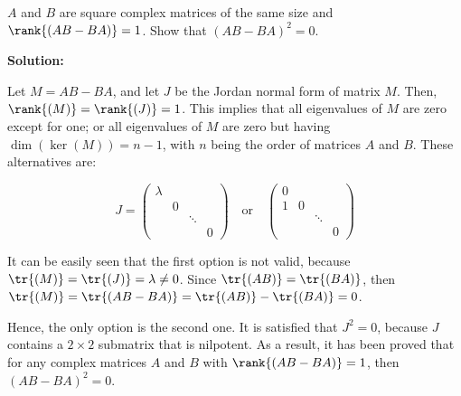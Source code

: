 \documentclass[../../main.tex]{subfiles}
\begin{document}
  \begin{shaded}
    $A$ and $B$ are square complex matrices of the same size and $\rank{(A B - B A)} = 1$. Show that $(A B - B A)^2 = 0$.
  \end{shaded}

  \textbf{Solution:}

  Let $M = A B - B A$, and let $J$ be the Jordan normal form of matrix $M$. Then, $\rank{(M)} = \rank{(J)} = 1$. This implies that all eigenvalues of $M$ are zero except for one; or all eigenvalues of $M$ are zero but having $\dim{(\ker{(M)})} = n - 1$, with $n$ being the order of matrices $A$ and $B$. These alternatives are:

  $$
  J = \left(
    \begin{matrix}
      \lambda &   &        &   \\
              & 0 &        &   \\
              &   & \ddots &   \\
              &   &        & 0
    \end{matrix}
  \right)
  \quad
  \text{or}
  \quad
  \left(
    \begin{matrix}
      0 &   &        &   \\
      1 & 0 &        &   \\
        &   & \ddots &   \\
        &   &        & 0
    \end{matrix}
  \right)
  $$

  It can be easily seen that the first option is not valid, because $\tr{(M)} = \tr{(J)} = \lambda \ne 0$. Since $\tr{(A B)} = \tr{(B A)}$, then $\tr{(M)} = \tr{(A B - B A)} = \tr{(A B)} - \tr{(B A)} = 0$.

  Hence, the only option is the second one. It is satisfied that $J^2 = 0$, because $J$ contains a $2 \times 2$ submatrix that is nilpotent. As a result, it has been proved that for any complex matrices $A$ and $B$ with $\rank{(A B - B A)} = 1$, then $(A B - B A)^2 = 0$.
\end{document}
